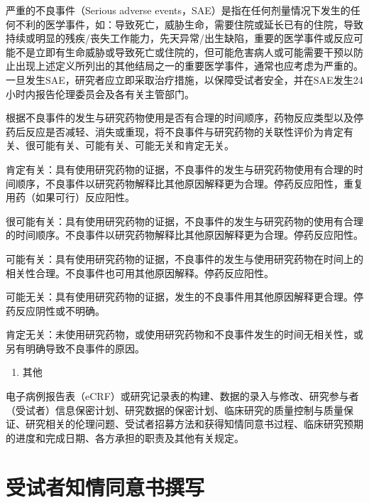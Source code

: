 \documentclass[
  chinese-hans,
  letterpaper,
  DIV=11,
  numbers=noendperiod]{scrreprt}
\providecommand{\tightlist}{%
  \setlength{\itemsep}{0pt}\setlength{\parskip}{0pt}}
\begin{document}
严重的不良事件（Serious adverse
events，SAE）是指在任何剂量情况下发生的任何不利的医学事件，如：导致死亡，威胁生命，需要住院或延长已有的住院，导致持续或明显的残疾/丧失工作能力，先天异常/出生缺陷，重要的医学事件或反应可能不是立即有生命威胁或导致死亡或住院的，但可能危害病人或可能需要干预以防止出现上述定义所列出的其他结局之一的重要医学事件，通常也应考虑为严重的。一旦发生SAE，研究者应立即采取治疗措施，以保障受试者安全，并在SAE发生24小时内报告伦理委员会及各有关主管部门。

根据不良事件的发生与研究药物使用是否有合理的时间顺序，药物反应类型以及停药后反应是否减轻、消失或重现，将不良事件与研究药物的关联性评价为肯定有关、很可能有关、可能有关、可能无关和肯定无关。

肯定有关：具有使用研究药物的证据，不良事件的发生与研究药物使用有合理的时间顺序，不良事件以研究药物解释比其他原因解释更为合理。停药反应阳性，重复用药（如果可行）反应阳性。

很可能有关：具有使用研究药物的证据，不良事件的发生与研究药物的使用有合理的时间顺序。不良事件以研究药物解释比其他原因解释更为合理。停药反应阳性。

可能有关：具有使用研究药物的证据，不良事件的发生与使用研究药物在时间上的相关性合理。不良事件也可用其他原因解释。停药反应阳性。

可能无关：具有使用研究药物的证据，发生的不良事件用其他原因解释更合理。停药反应阴性或不明确。

肯定无关：未使用研究药物，或使用研究药物和不良事件发生的时间无相关性，或另有明确导致不良事件的原因。

\begin{enumerate}
\def\labelenumi{\arabic{enumi}.}
\setcounter{enumi}{8}
\tightlist
\item
  其他
\end{enumerate}

电子病例报告表（eCRF）或研究记录表的构建、数据的录入与修改、研究参与者（受试者）信息保密计划、研究数据的保密计划、临床研究的质量控制与质量保证、研究相关的伦理问题、受试者招募方法和获得知情同意书过程、临床研究预期的进度和完成日期、各方承担的职责及其他有关规定。

\section{受试者知情同意书撰写}\label{ux53d7ux8bd5ux8005ux77e5ux60c5ux540cux610fux4e66ux64b0ux5199}
\end{document}
